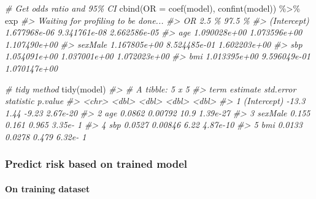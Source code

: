 \documentclass[
]{article}
\newenvironment{Shaded}{\begin{snugshade}}{\end{snugshade}}
\newcommand{\AttributeTok}[1]{\textcolor[rgb]{0.77,0.63,0.00}{#1}}
\newcommand{\CommentTok}[1]{\textcolor[rgb]{0.56,0.35,0.01}{\textit{#1}}}
\newcommand{\FunctionTok}[1]{\textcolor[rgb]{0.00,0.00,0.00}{#1}}
\newcommand{\NormalTok}[1]{#1}
\newcommand{\SpecialCharTok}[1]{\textcolor[rgb]{0.00,0.00,0.00}{#1}}
\begin{document}
\begin{Shaded}
\begin{Highlighting}[]
\CommentTok{\# Get odds ratio and 95\% CI}
\FunctionTok{cbind}\NormalTok{(}\AttributeTok{OR =} \FunctionTok{coef}\NormalTok{(model), }\FunctionTok{confint}\NormalTok{(model)) }\SpecialCharTok{\%\textgreater{}\%}\NormalTok{ exp}
\CommentTok{\#\textgreater{} Waiting for profiling to be done...}
\CommentTok{\#\textgreater{}                       OR        2.5 \%       97.5 \%}
\CommentTok{\#\textgreater{} (Intercept) 1.677968e{-}06 9.341761e{-}08 2.662586e{-}05}
\CommentTok{\#\textgreater{} age         1.090028e+00 1.073596e+00 1.107490e+00}
\CommentTok{\#\textgreater{} sexMale     1.167805e+00 8.524485e{-}01 1.602203e+00}
\CommentTok{\#\textgreater{} sbp         1.054091e+00 1.037001e+00 1.072023e+00}
\CommentTok{\#\textgreater{} bmi         1.013395e+00 9.596049e{-}01 1.070147e+00}

\CommentTok{\# tidy method}
\FunctionTok{tidy}\NormalTok{(model)}
\CommentTok{\#\textgreater{} \# A tibble: 5 x 5}
\CommentTok{\#\textgreater{}   term        estimate std.error statistic  p.value}
\CommentTok{\#\textgreater{}   \textless{}chr\textgreater{}          \textless{}dbl\textgreater{}     \textless{}dbl\textgreater{}     \textless{}dbl\textgreater{}    \textless{}dbl\textgreater{}}
\CommentTok{\#\textgreater{} 1 (Intercept) {-}13.3      1.44       {-}9.23  2.67e{-}20}
\CommentTok{\#\textgreater{} 2 age           0.0862   0.00792    10.9   1.39e{-}27}
\CommentTok{\#\textgreater{} 3 sexMale       0.155    0.161       0.965 3.35e{-} 1}
\CommentTok{\#\textgreater{} 4 sbp           0.0527   0.00846     6.22  4.87e{-}10}
\CommentTok{\#\textgreater{} 5 bmi           0.0133   0.0278      0.479 6.32e{-} 1}
\end{Highlighting}
\end{Shaded}

\hypertarget{predict-risk-based-on-trained-model}{%
\subsubsection{Predict risk based on trained
model}\label{predict-risk-based-on-trained-model}}

\hypertarget{on-training-dataset}{%
\paragraph{On training dataset}\label{on-training-dataset}}
\end{document}
